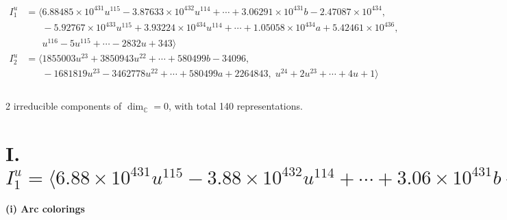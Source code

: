 \documentclass[1p]{elsarticle_modified}
\theoremstyle{definition}
\begin{document}
\begin{align*}
I^u_{1}&=\langle 
6.88485\times10^{431} u^{115}-3.87633\times10^{432} u^{114}+\cdots+3.06291\times10^{431} b-2.47087\times10^{434},\\
\phantom{I^u_{1}}&\phantom{= \langle  }-5.92767\times10^{433} u^{115}+3.93224\times10^{434} u^{114}+\cdots+1.05058\times10^{434} a+5.42461\times10^{436},\\
\phantom{I^u_{1}}&\phantom{= \langle  }u^{116}-5 u^{115}+\cdots-2832 u+343\rangle \\
I^u_{2}&=\langle 
1855003 u^{23}+3850943 u^{22}+\cdots+580499 b-34096,\\
\phantom{I^u_{2}}&\phantom{= \langle  }-1681819 u^{23}-3462778 u^{22}+\cdots+580499 a+2264843,\;u^{24}+2 u^{23}+\cdots+4 u+1\rangle \\
\\
\end{align*}
\raggedright * 2 irreducible components of $\dim_{\mathbb{C}}=0$, with total 140 representations.\\
\newpage
\renewcommand{\arraystretch}{1}
\centering \section*{I. $I^u_{1}= \langle 6.88\times10^{431} u^{115}-3.88\times10^{432} u^{114}+\cdots+3.06\times10^{431} b-2.47\times10^{434},\;-5.93\times10^{433} u^{115}+3.93\times10^{434} u^{114}+\cdots+1.05\times10^{434} a+5.42\times10^{436},\;u^{116}-5 u^{115}+\cdots-2832 u+343 \rangle$}
\flushleft \textbf{(i) Arc colorings}\\
\end{document}
